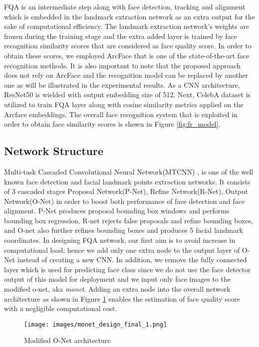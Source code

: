 \documentclass[runningheads]{llncs}
\begin{document}
FQA is an intermediate step along with face detection, tracking and alignment which is embedded in the landmark extraction network as an extra output for the sake of computational efficiency. The landmark extraction network's weights are frozen during the training stage and the extra added layer is trained by face recognition similarity scores that are considered as face quality score. In order to obtain these scores, we employed ArcFace\cite{ArcFace2018} that is one of the state-of-the-art face recognition methods. It is also important to note that the proposed approach does not rely on ArcFace\cite{ArcFace2018} and the recognition model can be replaced by another one as will be illustrated in the experimental results. As a CNN architecture, ResNet50\cite{ResNet2016} is wielded with output embedding size of 512. Next, CelebA dataset\cite{CelebA2015} is utilized to train FQA layer along with cosine similarity metrics applied on the Arcface embeddings. The overall face recognition system that is exploited in order to obtain face similarity scores is shown in Figure \ref{fig:fr_model}. 

\subsection{Network Structure}

Multi-task Cascaded Convolutional Neural Network(MTCNN) \cite{Mtcnn2016}, is one of the well known face detection and facial landmark points extraction networks. It consists of 3 cascaded stages Proposal Network(P-Net), Refine Network(R-Net), Output Network(O-Net) in order to boost both performance of face detection and face alignment. P-Net produces proposal bounding box windows and performs bounding box regression, R-net rejects false proposals and refine bounding boxes, and O-net also further refines bounding boxes and produces 5 facial landmark coordinates. In designing FQA network, our first aim is to avoid increase in computational load; hence we add only one extra node to the output layer of O-Net instead of creating a new CNN. In addition, we remove the fully connected layer which is used for predicting face class since we do not use the face detector output of this model for deployment and we input only face images to the modified o-net, aka \textit{monet}. Adding an extra node into the overall network architecture as shown in Figure \ref{fig:monet} enables the estimation of face quality score with a negligible computational cost. 

\begin{figure}[t]
  \texttt{[image: images/monet\_design\_final\_1.png]}
  \caption{Modified O-Net architecture}
  \label{fig:monet}
\end{figure}
\end{document}
